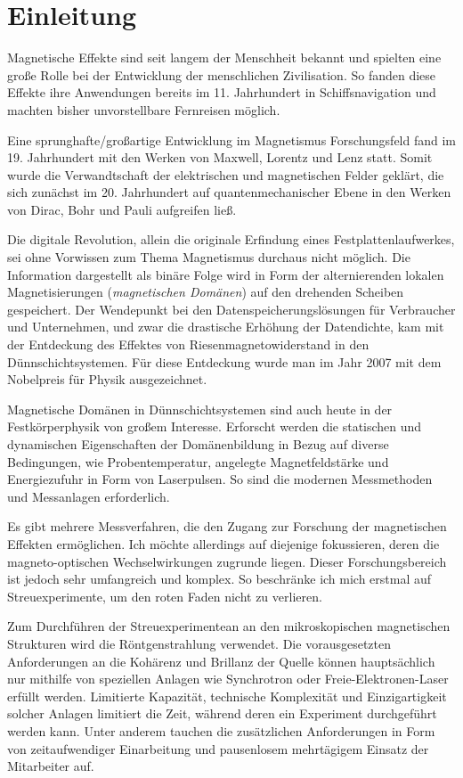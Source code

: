 \chapter{Einleitung}
\label{text:einleitung}
Magnetische Effekte sind seit langem der Menschheit bekannt und spielten eine große Rolle bei der Entwicklung der menschlichen Zivilisation. So fanden diese Effekte ihre Anwendungen bereits im 11. Jahrhundert in Schiffsnavigation und machten bisher unvorstellbare Fernreisen möglich.

\noindent
Eine sprunghafte/großartige Entwicklung im Magnetismus Forschungsfeld fand im 19. Jahrhundert mit den Werken von Maxwell, Lorentz und Lenz statt. Somit wurde die Verwandtschaft der elektrischen und magnetischen Felder geklärt, die sich zunächst im 20. Jahrhundert auf quantenmechanischer Ebene in den Werken von Dirac, Bohr und Pauli aufgreifen ließ.

\noindent
Die digitale Revolution, allein die originale Erfindung eines Festplattenlaufwerkes, sei ohne Vorwissen zum Thema Magnetismus durchaus nicht möglich. Die Information dargestellt als binäre Folge wird in Form der alternierenden lokalen Magnetisierungen (\emph{magnetischen Domänen}) auf den drehenden Scheiben gespeichert. Der Wendepunkt bei den Datenspeicherungslösungen für Verbraucher und Unternehmen, und zwar die drastische Erhöhung der Datendichte, kam mit der Entdeckung des Effektes von Riesenmagnetowiderstand in den Dünnschichtsystemen. Für diese Entdeckung wurde man im Jahr 2007 mit dem Nobelpreis für Physik ausgezeichnet.

\noindent
Magnetische Domänen in Dünnschichtsystemen sind auch heute in der Festkörperphysik von großem Interesse. Erforscht werden die statischen und dynamischen Eigenschaften der Domänenbildung in Bezug auf diverse Bedingungen, wie Probentemperatur, angelegte Magnetfeldstärke und Energiezufuhr in Form von Laserpulsen. So sind die modernen Messmethoden und Messanlagen erforderlich.

\noindent
Es gibt mehrere Messverfahren, die den Zugang zur Forschung der magnetischen Effekten ermöglichen. Ich möchte allerdings auf diejenige fokussieren, deren die magneto-optischen Wechselwirkungen zugrunde liegen. Dieser Forschungsbereich ist jedoch sehr umfangreich und komplex. So beschränke ich mich erstmal auf Streuexperimente, um den roten Faden nicht zu verlieren.

\noindent
Zum Durchführen der Streuexperimentean an den mikroskopischen magnetischen Strukturen wird die Röntgenstrahlung verwendet. Die vorausgesetzten Anforderungen an die Kohärenz und Brillanz der Quelle können hauptsächlich nur mithilfe von speziellen Anlagen wie Synchrotron oder Freie-Elektronen-Laser erfüllt werden. Limitierte Kapazität, technische Komplexität und Einzigartigkeit solcher Anlagen limitiert die Zeit, während deren ein Experiment durchgeführt werden kann. Unter anderem tauchen die zusätzlichen Anforderungen in Form von zeitaufwendiger Einarbeitung und pausenlosem mehrtägigem Einsatz der Mitarbeiter auf.

